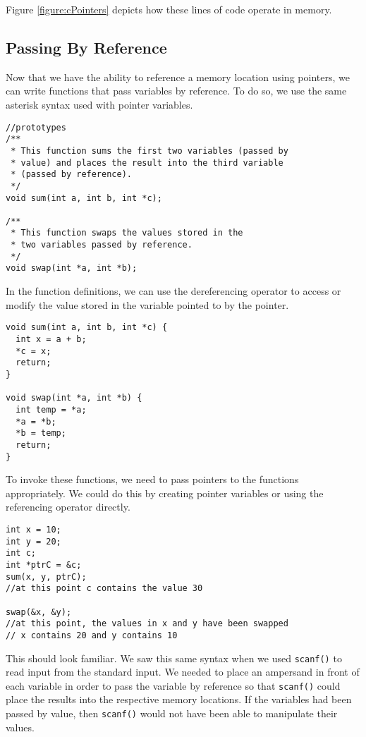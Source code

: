 Figure \ref{figure:cPointers} depicts how these lines of
code operate in memory.



\subsection{Passing By Reference}

Now that we have the ability to reference a memory location 
using pointers, we can write functions that pass variables by 
reference.  To do so, we use the same asterisk syntax used
with pointer variables.

\begin{verbatim}
//prototypes
/**
 * This function sums the first two variables (passed by
 * value) and places the result into the third variable 
 * (passed by reference).
 */
void sum(int a, int b, int *c);

/**
 * This function swaps the values stored in the
 * two variables passed by reference.
 */
void swap(int *a, int *b);
\end{verbatim}

In the function definitions, we can use the dereferencing
operator to access or modify the value stored in the
variable pointed to by the pointer.  

\begin{verbatim}
void sum(int a, int b, int *c) {
  int x = a + b;
  *c = x;
  return;
}

void swap(int *a, int *b) {
  int temp = *a;
  *a = *b;
  *b = temp;
  return;
}
\end{verbatim}

To invoke these functions, we need to pass pointers to 
the functions appropriately.  We could do this by
creating pointer variables or using the referencing operator
directly.

\begin{verbatim}
int x = 10;
int y = 20;
int c;
int *ptrC = &c;
sum(x, y, ptrC);
//at this point c contains the value 30

swap(&x, &y);
//at this point, the values in x and y have been swapped
// x contains 20 and y contains 10
\end{verbatim}

This should look familiar.  We saw this same syntax when
we used \texttt{scanf()} to read input from the standard
input.  We needed to place an ampersand in front of each
variable in order to pass the variable by reference so that
\texttt{scanf()} could place the results into the respective
memory locations.  If the variables had been passed by 
value, then \texttt{scanf()} would not have been able
to manipulate their values.

